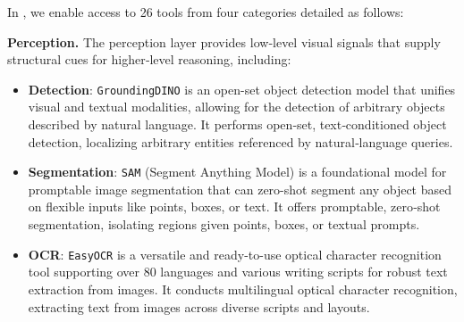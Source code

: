 In \env, we enable access to 26 tools from four categories detailed as follows: 

\noindent \textbf{Perception.}
The perception layer provides low‑level visual signals that supply structural cues for higher‑level reasoning, including:
\begin{itemize}
    \item \textbf{Detection}: \texttt{GroundingDINO} is an open-set object detection model that unifies visual and textual modalities, allowing for the detection of arbitrary objects described by natural language. It performs open‑set, text‑conditioned object detection, localizing arbitrary entities referenced by natural‑language queries.
    \item \textbf{Segmentation}: \texttt{SAM} (Segment Anything Model) is a foundational model for promptable image segmentation that can zero-shot segment any object based on flexible inputs like points, boxes, or text. It offers promptable, zero‑shot segmentation, isolating regions given points, boxes, or textual prompts.
    \item \textbf{OCR}: \texttt{EasyOCR} is a versatile and ready-to-use optical character recognition tool supporting over 80 languages and various writing scripts for robust text extraction from images. It conducts multilingual optical character recognition, extracting text from images across diverse scripts and layouts.
\end{itemize}

